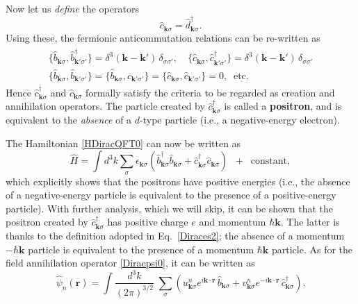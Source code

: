 \documentclass[prx,12pt]{revtex4-2}
\begin{document}
Now let us \textit{define} the operators
\begin{equation}
  \hat{c}_{\mathbf{k}\sigma} = \hat{d}^\dagger_{\mathbf{k}\sigma}.
\end{equation}
Using these, the fermionic anticommutation relations can be re-written as
\begin{align}
  \begin{aligned}
    \{\hat{b}_{\mathbf{k}\sigma}, \hat{b}_{\mathbf{k}'\sigma'}^\dagger \}
    = \delta^3(\mathbf{k}-\mathbf{k}') \, \delta_{\sigma\sigma'}, \quad
    \{\hat{c}_{\mathbf{k}\sigma}, \hat{c}_{\mathbf{k}'\sigma'}^\dagger \}
    = \delta^3(\mathbf{k}-\mathbf{k}') \, \delta_{\sigma\sigma'} \\
    \{\hat{b}_{\mathbf{k}\sigma}, \hat{b}_{\mathbf{k}'\sigma'} \} = 
    \{\hat{b}_{\mathbf{k}\sigma}, \hat{c}_{\mathbf{k}'\sigma'} \} = 
    \{\hat{c}_{\mathbf{k}\sigma}, \hat{c}_{\mathbf{k}'\sigma'} \} = 0, \;\;\textrm{etc.}
  \end{aligned}
  \label{Diracanticommutators}
\end{align}
Hence $\hat{c}^\dagger_{\mathbf{k}\sigma}$ and
$\hat{c}_{\mathbf{k}\sigma}$ formally satisfy the criteria to be
regarded as creation and annihilation operators.  The particle created
by $\hat{c}^\dagger_{\mathbf{k}\sigma}$ is called a \textbf{positron},
and is equivalent to the \textit{absence} of a $d$-type particle
(i.e., a negative-energy electron).

The Hamiltonian \eqref{HDiracQFT0} can now be written as
\begin{equation}
  \hat{H} = \int d^3k \sum_\sigma \epsilon_{\mathbf{k}\sigma} \left(
  \hat{b}^\dagger_{\mathbf{k}\sigma} \hat{b}_{\mathbf{k}\sigma}
  + \hat{c}^\dagger_{\mathbf{k}\sigma} \hat{c}_{\mathbf{k}\sigma}
  \right) \;\; + \;\; \textrm{constant},
  \label{HDiracQFT}
\end{equation}
which explicitly shows that the positrons have positive energies
(i.e., the absence of a negative-energy particle is equivalent to the
presence of a positive-energy particle).  With further analysis, which
we will skip, it can be shown that the positron created by
$\hat{c}^\dagger_{\mathbf{k}\sigma}$ has positive charge $e$ and
momentum $\hbar\mathbf{k}$.  The latter is thanks to the definition
adopted in Eq.~\eqref{Diraces2}; the absence of a momentum $-\hbar
\mathbf{k}$ particle is equivalent to the presence of a momentum
$\hbar \mathbf{k}$ particle.  As for the field annihilation operator
\eqref{Diracpsi0}, it can be written as
\begin{equation}
  \hat{\psi}_n(\mathbf{r})
  = \int \frac{d^3k}{(2\pi)^{3/2}} \; \sum_\sigma
  \left(
  u^n_{\mathbf{k}\sigma} e^{i\mathbf{k}\cdot\mathbf{r}} \, \hat{b}_{\mathbf{k}\sigma}
  + v^n_{\mathbf{k}\sigma} e^{-i\mathbf{k}\cdot\mathbf{r}} \,
  \hat{c}^\dagger_{\mathbf{k}\sigma}\right).
  \label{Diracpsi}
\end{equation}
\end{document}

